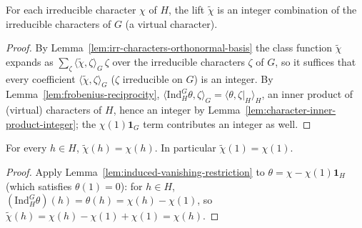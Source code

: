 \begin{lemma}
    \label{lem:lift-is-virtual-character}
    For each irreducible character $\chi$ of $H$, the lift $\widetilde{\chi}$ is
    an integer combination of the irreducible characters of $G$ (a virtual
    character).
\end{lemma}
\begin{proof}
    By Lemma~\ref{lem:irr-characters-orthonormal-basis} the class function
    $\widetilde{\chi}$ expands as $\sum_\zeta \langle \widetilde{\chi},
    \zeta\rangle_G\,\zeta$ over the irreducible characters $\zeta$ of $G$, so it
    suffices that every coefficient
    $\langle \widetilde{\chi}, \zeta \rangle_G$ ($\zeta$ irreducible on $G$) is an
    integer. By Lemma~\ref{lem:frobenius-reciprocity},
    $\langle \mathrm{Ind}_H^G \theta, \zeta \rangle_G =
    \langle \theta, \zeta|_H \rangle_H$, an inner product of (virtual) characters
    of $H$, hence an integer by
    Lemma~\ref{lem:character-inner-product-integer}; the $\chi(1)\mathbf 1_G$ term
    contributes an integer as well.
\end{proof}

\begin{lemma}
    \label{lem:lift-restricts}
    \leanok
    For every $h \in H$, $\widetilde{\chi}(h) = \chi(h)$. In particular
    $\widetilde{\chi}(1) = \chi(1)$.
\end{lemma}
\begin{proof}
    Apply Lemma~\ref{lem:induced-vanishing-restriction} to $\theta = \chi -
    \chi(1)\mathbf 1_H$ (which satisfies $\theta(1)=0$): for $h \in H$,
    $(\mathrm{Ind}_H^G\theta)(h) = \theta(h) = \chi(h) - \chi(1)$, so
    $\widetilde{\chi}(h) = \chi(h) - \chi(1) + \chi(1) = \chi(h)$.
\end{proof}


